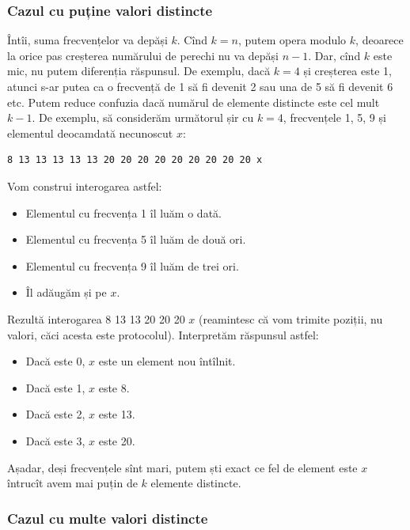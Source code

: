 \subsubsection*{Cazul cu puține valori distincte}

Întîi, suma frecvențelor va depăși $k$. Cînd $k=n$, putem opera modulo $k$, deoarece la orice pas creșterea numărului de perechi nu va depăși $n-1$. Dar, cînd $k$ este mic, nu putem diferenția răspunsul. De exemplu, dacă $k=4$ și creșterea este 1, atunci s-ar putea ca o frecvență de 1 să fi devenit 2 sau una de 5 să fi devenit 6 etc. Putem reduce confuzia dacă numărul de elemente distincte este cel mult $k-1$. De exemplu, să considerăm următorul șir cu $k=4$, frecvențele 1, 5, 9 și elementul deocamdată necunoscut $x$:

\begin{verbatim}
8 13 13 13 13 13 20 20 20 20 20 20 20 20 20 x
\end{verbatim}

Vom construi interogarea astfel:

\begin{itemize}
  \item Elementul cu frecvența 1 îl luăm o dată.
  \item Elementul cu frecvența 5 îl luăm de două ori.
  \item Elementul cu frecvența 9 îl luăm de trei ori.
  \item Îl adăugăm și pe $x$.
\end{itemize}

Rezultă interogarea 8 13 13 20 20 20 $x$ (reamintesc că vom trimite poziții, nu valori, căci acesta este protocolul). Interpretăm răspunsul astfel:

\begin{itemize}
  \item Dacă este 0, $x$ este un element nou întîlnit.
  \item Dacă este 1, $x$ este 8.
  \item Dacă este 2, $x$ este 13.
  \item Dacă este 3, $x$ este 20.
\end{itemize}

Așadar, deși frecvențele sînt mari, putem ști exact ce fel de element este $x$ întrucît avem mai puțin de $k$ elemente distincte.

\subsubsection*{Cazul cu multe valori distincte}

